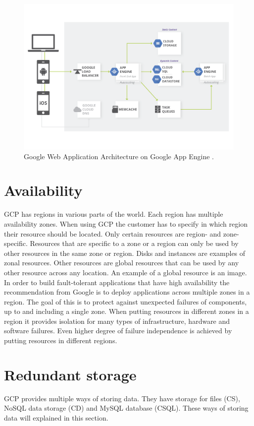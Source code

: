 \documentclass[11pt]{report}
\begin{document}
\begin{figure}[H]
\centering
\includegraphics[scale=0.43]{../GFX/GCPwebapparchi}
\caption[Google Web Application Architecture on Google App Engine]{Google Web Application Architecture on Google App Engine \cite{google_webapp_architecture}.}
\label{fig:webapparchitecture}
\end{figure}

\section{Availability}
GCP has regions in various parts of the world. Each region has multiple availability zones. When using GCP the customer has to specify in which region their resource should be located. Only certain resources are region- and zone-specific. Resources that are specific to a zone or a region can only be used by other resources in the same zone or region. Disks and instances are examples of zonal resources. Other resources are global resources that can be used by any other resource across any location. An example of a global resource is an image. In order to build fault-tolerant applications that have high availability the recommendation from Google is to deploy applications across multiple zones in a region. The goal of this is to protect against unexpected failures of components, up to and including a single zone. When putting resources in different zones in a region it provides isolation for many types of infrastructure, hardware and software failures. Even higher degree of failure independence is achieved by putting resources in different regions.

\section{Redundant storage}
GCP provides multiple ways of storing data. They have storage for files (CS), NoSQL data storage (CD) and MySQL database (CSQL). These ways of storing data will explained in this section.
\end{document}
